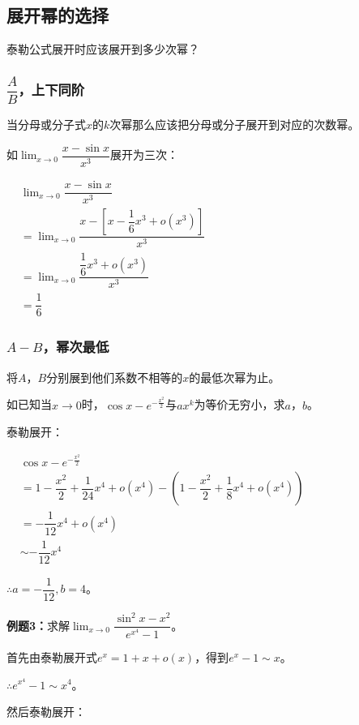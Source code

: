 \documentclass[UTF8, 12pt]{ctexart}
\begin{document}
\subsection{展开幂的选择}

泰勒公式展开时应该展开到多少次幂？

\subsubsection{\texorpdfstring{$\dfrac{A}{B}$}型，上下同阶}

当分母或分子式$x$的$k$次幂那么应该把分母或分子展开到对应的次数幂。

如$\lim_{x\to 0}\dfrac{x-\sin x}{x^3}$展开为三次：

$
\begin{aligned}
    & \lim_{x\to 0}\dfrac{x-\sin x}{x^3} \\
    & =\lim_{x\to 0}\dfrac{x-\left[x-\dfrac{1}{6}x^3+o(x^3)\right]}{x^3} \\
    & =\lim_{x\to 0}\dfrac{\dfrac{1}{6}x^3+o(x^3)}{x^3} \\
    & =\dfrac{1}{6}
\end{aligned}
$

\subsubsection{\texorpdfstring{$A-B$}型，幂次最低}

将$A$，$B$分别展到他们系数不相等的$x$的最低次幂为止。

如已知当$x\to 0$时，$\cos x-e^{-\frac{x^2}{2}}$与$ax^k$为等价无穷小，求$a$，$b$。

泰勒展开：

$
\begin{aligned}
    & \cos x-e^{-\frac{x^2}{2}} \\
    & = 1-\dfrac{x^2}{2}+\dfrac{1}{24}x^4+o(x^4)-\left(1-\dfrac{x^2}{2}+\dfrac{1}{8}x^4+o(x^4)\right) \\
    & = -\dfrac{1}{12}x^4+o(x^4) \\
    & \sim -\dfrac{1}{12}x^4
\end{aligned}
$

$\therefore a=-\dfrac{1}{12},b=4$。

\textbf{例题3：}求解$\lim_{x\to 0}\dfrac{\sin^2x-x^2}{e^{x^4}-1}$。

首先由泰勒展开式$e^x=1+x+o(x)$，得到$e^x-1\sim x$。

$\therefore e^{x^4}-1\sim x^4$。

然后泰勒展开：
\end{document}
